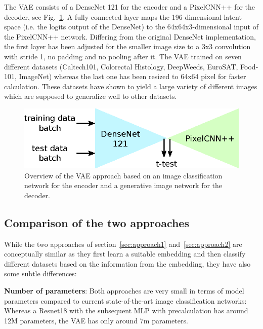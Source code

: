 \documentclass{article}
\begin{document}
The VAE consists of a DenseNet 121 \cite{huang17} for the encoder and a PixelCNN++ \cite{salimans17} for the decoder, see Fig.~\ref{fig:approach2}. A fully connected layer maps the 196-dimensional latent space (i.e. the logits output of the DenseNet) to the 64x64x3-dimensional input of the PixelCNN++ network. Differing from the original DenseNet implementation, the first layer has been adjusted for the smaller image size to a 3x3 convolution with stride 1, no padding and no pooling after it. The VAE trained on seven different datasets (Caltech101, Colorectal Histology, DeepWeeds, EuroSAT, Food-101, ImageNet) whereas the last one has been resized to 64x64 pixel for faster calculation. These datasets have shown to yield a large variety of different images which are supposed to generalize well to other datasets.

%
\begin{figure}[htb]
\begin{center}
 	\includegraphics[width=0.8\linewidth]{../figures/approach2.eps} 
\end{center}
\caption{Overview of the VAE approach based on an image classification network for the encoder and a generative image network for the decoder.}
\label{fig:approach2}
\end{figure} 
% 


\subsection{Comparison of the two approaches}
\label{sec:comparison}

While the two approaches of section~\ref{sec:approach1} and~\ref{sec:approach2} are conceptually similar as they first learn a suitable embedding and then classify different datasets based on the information from the embedding, they have also some subtle differences:

\textbf{Number of parameters}: Both approaches are very small in terms of model parameters compared to current state-of-the-art image classification networks: Whereas a Resnet18 with the subsequent MLP with precalculation has around 12M parameters, the VAE has only around 7m parameters.
\end{document}
